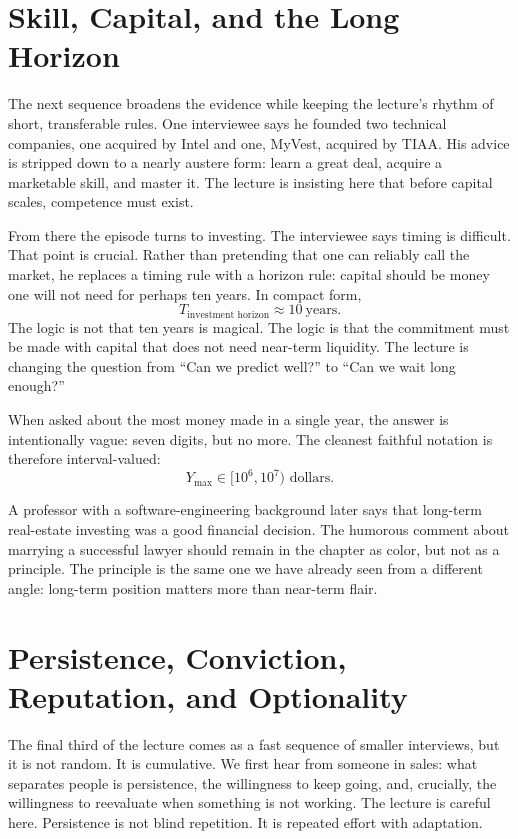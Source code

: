 \section{Skill, Capital, and the Long Horizon}

The next sequence broadens the evidence while keeping the lecture's rhythm of short, transferable rules. One interviewee says he founded two technical companies, one acquired by Intel and one, MyVest, acquired by TIAA. His advice is stripped down to a nearly austere form: learn a great deal, acquire a marketable skill, and master it. The lecture is insisting here that before capital scales, competence must exist.

From there the episode turns to investing. The interviewee says timing is difficult. That point is crucial. Rather than pretending that one can reliably call the market, he replaces a timing rule with a horizon rule: capital should be money one will not need for perhaps ten years. In compact form,
\begin{equation}
T_{\text{investment horizon}} \approx 10\ \text{years}.
\end{equation}
The logic is not that ten years is magical. The logic is that the commitment must be made with capital that does not need near-term liquidity. The lecture is changing the question from ``Can we predict well?'' to ``Can we wait long enough?''

When asked about the most money made in a single year, the answer is intentionally vague: seven digits, but no more. The cleanest faithful notation is therefore interval-valued:
\begin{equation}
Y_{\max} \in [10^{6},10^{7}) \text{ dollars}.
\end{equation}

A professor with a software-engineering background later says that long-term real-estate investing was a good financial decision. The humorous comment about marrying a successful lawyer should remain in the chapter as color, but not as a principle. The principle is the same one we have already seen from a different angle: long-term position matters more than near-term flair.

\section{Persistence, Conviction, Reputation, and Optionality}

The final third of the lecture comes as a fast sequence of smaller interviews, but it is not random. It is cumulative. We first hear from someone in sales: what separates people is persistence, the willingness to keep going, and, crucially, the willingness to reevaluate when something is not working. The lecture is careful here. Persistence is not blind repetition. It is repeated effort with adaptation.

